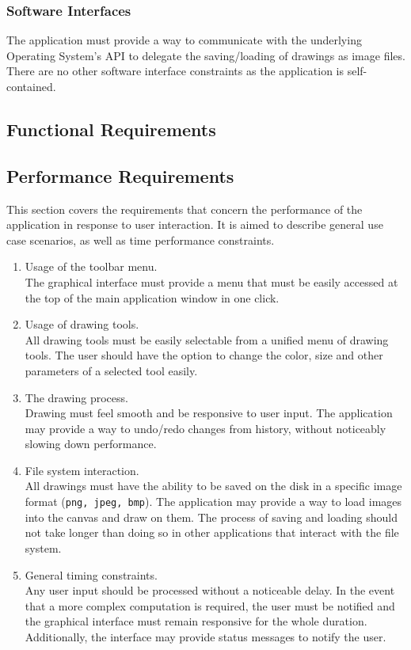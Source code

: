 \documentclass{article}
\begin{document}
\subsubsection{Software Interfaces}
The application must provide a way to communicate with the underlying Operating System's API to delegate the saving/loading of drawings as image files. There are no other software interface constraints as the application is self-contained.
\subsection{Functional Requirements}

\subsection{Performance Requirements}
This section covers the requirements that concern the performance of the application in response to user interaction. It is aimed to describe general use case scenarios, as well as time performance constraints.
\begin{enumerate}
\item Usage of the toolbar menu.
\\
The graphical interface must provide a menu that must be easily accessed at the top of the main application window in one click.
\item Usage of drawing tools.
\\
All drawing tools must be easily selectable from a unified menu of drawing tools. The user should have the option to change the color, size and other parameters of a selected tool easily.
\item The drawing process.
\\
Drawing must feel smooth and be responsive to user input. The application may provide a way to undo/redo changes from history, without noticeably slowing down performance.
\item File system interaction.
\\
All drawings must have the ability to be saved on the disk in a specific image format (\texttt{png, jpeg, bmp}). The application may provide a way to load images into the canvas and draw on them. The process of saving and loading should not take longer than doing so in other applications that interact with the file system.
\item General timing constraints.
\\
Any user input should be processed without a noticeable delay. In the event that a more complex computation is required, the user must be notified and the graphical interface must remain responsive for the whole duration. Additionally, the interface may provide status messages to notify the user.
\end{enumerate}
\end{document}

